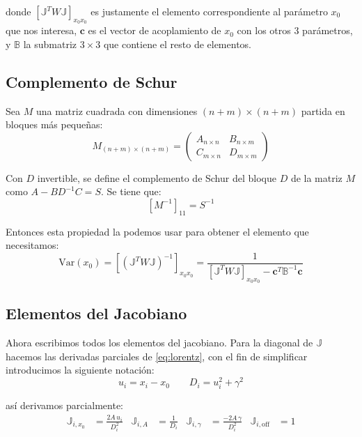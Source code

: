 donde $\left[\mathbb{J}^T W \mathbb{J}\right]_{x_0 x_0}$ es justamente el elemento correspondiente al parámetro $x_0$ que nos interesa, $\mathbf{c}$ es el vector de acoplamiento de $x_0$ con los otros 3 parámetros, y $\mathbb{B}$ la submatriz $3\times 3$ que contiene el resto de elementos.

\subsection*{Complemento de Schur}

Sea $M$ una matriz cuadrada con dimensiones $(n+m)\times(n+m)$ partida en bloques más pequeñas:
\begin{equation}
    M_{(n+m)\times(n+m)} = \begin{pmatrix} A_{n\times n} & B_{n\times m} \\ C_{m\times n} & D_{m\times m} \end{pmatrix}
\end{equation}

Con $D$ invertible, se define el complemento de Schur del bloque $D$ de la matriz $M$ como $A - BD^{-1}C = S$. Se tiene que:
\begin{equation}
    \left[M^{-1}\right]_{11} = S^{-1}
\end{equation}

Entonces esta propiedad la podemos usar para obtener el elemento que necesitamos:
\begin{equation}
    \mathrm{Var}(x_0) = \left[\left(\mathbb{J}^T W \mathbb{J}\right)^{-1}\right]_{x_0 x_0} = \frac{1}{\left[\mathbb{J}^T W \mathbb{J}\right]_{x_0 x_0} - \mathbf{c}^T \mathbb{B}^{-1} \mathbf{c}} \label{eq:var_schur}
\end{equation}

\subsection{Elementos del Jacobiano}

Ahora escribimos todos los elementos del jacobiano. Para la diagonal de $\mathbb{J}$ hacemos las derivadas parciales de \eqref{eq:lorentz}, con el fin de simplificar introducimos la siguiente notación:
\begin{equation}
    u_i = x_i - x_0 \qquad D_i = u_i^2 + \gamma^2
\end{equation}

así derivamos parcialmente:
\begin{align}
    \mathbb{J}_{i,x_0} &= \frac{2A\,u_i}{D_i^2} &
    \mathbb{J}_{i,A} &= \frac{1}{D_i} &
    \mathbb{J}_{i,\gamma} &= \frac{-2A\,\gamma}{D_i^2} &
    \mathbb{J}_{i,\text{off}} &= 1
\end{align}

